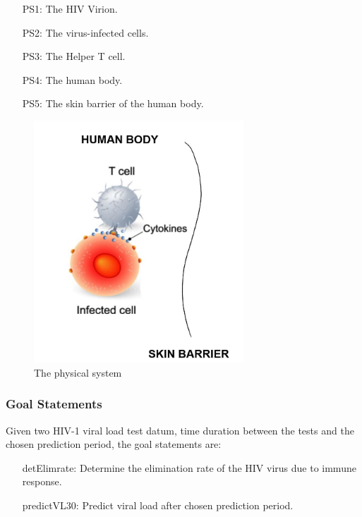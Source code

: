 \documentclass[12pt]{article}
\begin{document}
\begin{itemize}
\item[PS1:]{The HIV Virion.}
\item[PS2:]{The virus-infected cells.}
\item[PS3:]{The Helper T cell.}
\item[PS4:]{The human body.}
\item[PS5:]{The skin barrier of the human body.}
\end{itemize}
\begin{figure}
\begin{center}
\includegraphics[width=0.7\textwidth]{../../../datafiles/Diagnose/Virusinbody.JPG}
\caption{The physical system}
\label{Figure:Virus}
\end{center}
\end{figure}
\subsubsection{Goal Statements}
\label{Sec:GoalStmt}
Given two HIV-1 viral load test datum, time duration between the tests and the chosen prediction period, the goal statements are:

\begin{itemize}
\item[detElimrate:\phantomsection\label{detElimrate}]{Determine the elimination rate of the HIV virus due to immune response.}
\item[predictVL30:\phantomsection\label{predictVL30}]{Predict viral load after chosen prediction period.}
\end{itemize}
\end{document}
